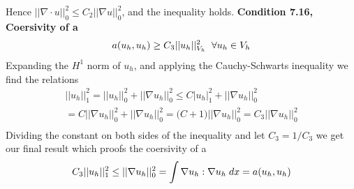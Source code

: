 \documentclass[a4paper,norsk]{article}
\begin{document}
Hence $||\nabla \cdot u||_0^2 \leq C_2 ||\nabla u ||_0^2$, and the inequality holds. 
\textbf{Condition 7.16, Coersivity of a}
\begin{align*}
 a(u_h, u_h) \geq C_3 ||u_h||_{V_h}^2 \hspace{2mm} \forall u_h \in V_h
\end{align*}
Expanding the $H^1$ norm of $u_h$, and applying the Cauchy-Schwarts inequality we find the relations
\begin{align*}
||u_h||_1^2 = ||u_h||_0^2 + ||\nabla u_h||_0^2 \leq C|u_h|_1^2 + ||\nabla u_h||_0^2 \\
= C||\nabla u_h||_0^2 + ||\nabla u_h||_0^2 = \big(C + 1\big)||\nabla u_h||_0^2 = C_3 ||\nabla u_h||_0^2 \\
\end{align*}
Dividing the constant on both sides of the inequality and let $C_3 = 1/C_3$ we get our final result which proofs the coersivity of a
\begin{align*}
C_3||u_h||_1^2 \leq ||\nabla u_h||_0^2 = \int \nabla u_h : \nabla u_h \hspace{1mm} dx = a(u_h, u_h)
\end{align*}
\newpage
\end{document}
